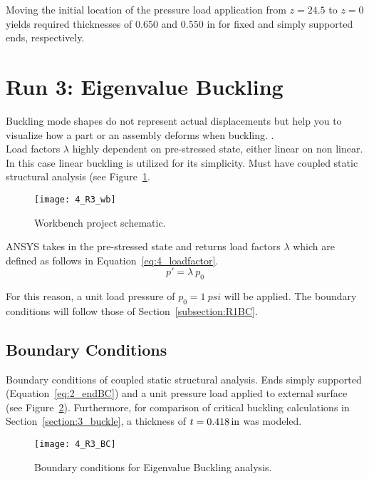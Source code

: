 Moving the initial location of the pressure load application from $z=24.5$ to $z=0$ yields required thicknesses of $0.650$ and $0.550$ in for fixed and simply supported ends, respectively.

\section{Run 3: Eigenvalue Buckling}
\label{section:4_R3}

Buckling mode shapes do not represent actual displacements but help you to visualize how a part or an assembly deforms when buckling. \cite{ANSYS}. \\

Load factors $\lambda$ highly dependent on pre-stressed state, either linear on non linear.\\

In this case linear buckling is utilized for its simplicity. Must have coupled static structural analysis (see Figure~\ref{fig:4_R3_wb}.

\begin{figure}[H]
	\centering
	\texttt{[image: 4\_R3\_wb]}
	\caption{Workbench project schematic.}
	\label{fig:4_R3_wb}
\end{figure}

ANSYS takes in the pre-stressed state and returns load factors $\lambda$ which are defined as follows in Equation~\ref{eq:4_loadfactor}.
\begin{equation}
	\label{eq:4_loadfactor}
	p' = \lambda \ p_0
\end{equation}

For this reason, a unit load pressure of $p_0 = 1\ psi$ will be applied. The boundary conditions will follow those of Section~\ref{subsection:R1BC}.

\subsection{Boundary Conditions}

Boundary conditions of coupled static structural analysis. Ends simply supported (Equation~\ref{eq:2_endBC}) and a unit pressure load applied to external surface (see Figure~\ref{fig:4_R3_BC}). Furthermore, for comparison of critical buckling calculations in Section~\ref{section:3_buckle}, a thickness of $t=0.418\,\mathrm{in}$ was modeled. 

\begin{figure}[H]
	\centering
	\texttt{[image: 4\_R3\_BC]}
	\caption{Boundary conditions for Eigenvalue Buckling analysis.}
	\label{fig:4_R3_BC}
\end{figure}

